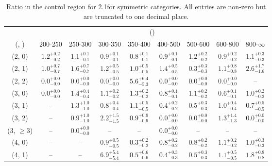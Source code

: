 \begin{table}[h!]
\tiny
\centering
\caption{Ratio in the \mmj control region for 2.1\ifb for symmetric categories. All entries are non-zero but are truncated to one decimal place.\label{tab:ratiosepnaive_mumu_ewk_sym}}
\begin{tabular}
{ccccccccc}
	\hline\hline
	& \multicolumn{8}{c}{\scalht (\gev)} \\ 
	 (\njet,  \nb) & 200-250 & 250-300 & 300-350 & 350-400 & 400-500 & 500-600 & 600-800 & 800-$\infty$ \\ [0.8ex] 
\hline
	(2, 0) & $1.2^{+ 0.2 }_{- 0.2 }$ & $1.1^{+ 0.1 }_{- 0.1 }$ & $0.9^{+ 0.1 }_{- 0.1 }$ & $0.8^{+ 0.1 }_{- 0.1 }$ & $0.9^{+ 0.1 }_{- 0.1 }$ & $1.2^{+ 0.2 }_{- 0.2 }$ & $0.9^{+ 0.2 }_{- 0.2 }$ & $1.1^{+ 0.3 }_{- 0.3 }$ \\[0.5ex] 
	(2, 1) & $1.0^{+ 0.7 }_{- 0.7 }$ & $1.6^{+ 0.7 }_{- 0.7 }$ & $1.2^{+ 0.5 }_{- 0.5 }$ & $1.0^{+ 0.5 }_{- 0.5 }$ & $1.4^{+ 0.5 }_{- 0.5 }$ & $0.3^{+ 0.3 }_{- 0.3 }$ & $1.1^{+ 0.8 }_{- 0.8 }$ & $2.6^{+ 1.7 }_{- 1.6 }$ \\[0.5ex] 
	(2, 2) & $0.0^{+ 0.0 }_{- 0.0 }$ & $0.0^{+ 0.0 }_{- 0.0 }$ & $0.0^{+ 0.0 }_{- 0.0 }$ & $5.6^{+ 6.4 }_{- 5.3 }$ & $0.0^{+ 0.0 }_{- 0.0 }$ & $0.0^{+ 0.0 }_{- 0.0 }$ & $0.0^{+ 0.0 }_{- 0.0 }$ & -- \\[0.5ex] 
	(3, 0) & $0.0^{+ 0.0 }_{- 0.0 }$ & $1.4^{+ 0.4 }_{- 0.4 }$ & $1.1^{+ 0.2 }_{- 0.2 }$ & $1.3^{+ 0.2 }_{- 0.2 }$ & $0.8^{+ 0.1 }_{- 0.1 }$ & $1.1^{+ 0.2 }_{- 0.2 }$ & $0.6^{+ 0.1 }_{- 0.1 }$ & $1.0^{+ 0.2 }_{- 0.2 }$ \\[0.5ex] 
	(3, 1) & -- & $1.3^{+ 1.0 }_{- 1.0 }$ & $0.8^{+ 0.4 }_{- 0.4 }$ & $1.1^{+ 0.5 }_{- 0.5 }$ & $0.4^{+ 0.2 }_{- 0.2 }$ & $0.5^{+ 0.3 }_{- 0.3 }$ & $1.0^{+ 0.4 }_{- 0.4 }$ & $0.7^{+ 0.5 }_{- 0.5 }$ \\[0.5ex] 
	(3, 2) & -- & $0.9^{+ 1.0 }_{- 1.0 }$ & $2.2^{+ 1.5 }_{- 1.5 }$ & $0.9^{+ 0.9 }_{- 0.9 }$ & $0.0^{+ 0.0 }_{- 0.0 }$ & $0.0^{+ 0.0 }_{- 0.0 }$ & $1.3^{+ 1.4 }_{- 1.3 }$ & $0.0^{+ 0.0 }_{- 0.0 }$ \\[0.5ex] 
	(3, $\ge3$) & -- & $0.0^{+ 0.0 }_{- 0.0 }$ & -- & -- & $0.0^{+ 0.0 }_{- 0.0 }$ & -- & -- & -- \\[0.5ex] 
	(4, 0) & -- & -- & $0.9^{+ 0.5 }_{- 0.5 }$ & $0.3^{+ 0.2 }_{- 0.2 }$ & $0.8^{+ 0.2 }_{- 0.2 }$ & $0.8^{+ 0.2 }_{- 0.2 }$ & $1.1^{+ 0.2 }_{- 0.2 }$ & $1.0^{+ 0.3 }_{- 0.3 }$ \\[0.5ex] 
	(4, 1) & -- & -- & $6.9^{+ 5.4 }_{- 5.4 }$ & $0.5^{+ 0.6 }_{- 0.6 }$ & $0.4^{+ 0.3 }_{- 0.3 }$ & $0.5^{+ 0.3 }_{- 0.3 }$ & $1.1^{+ 0.5 }_{- 0.5 }$ & $1.8^{+ 0.8 }_{- 0.8 }$ \\[0.5ex] 

\end{tabular}
\end{table}
